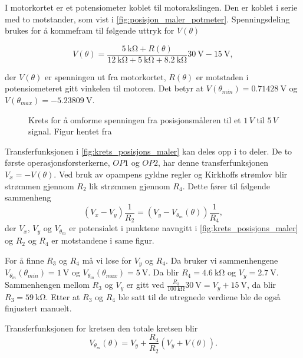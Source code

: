 I motorkortet er et potensiometer koblet til motorakslingen. Den er koblet i serie med to motstander, som vist i \autoref{fig:posisjon_maler_potmeter}. Spenningsdeling brukes for å kommefram til følgende uttryk for $V(\theta)$

\begin{equation}
    \label{eq:V_av_theta}
    V(\theta) = \frac{\SI{5}{\kilo\ohm} + R(\theta)}{\SI{12}{\kilo\ohm} + \SI{5}{\kilo\ohm} + \SI{8.2}{\kilo\ohm}} \SI{30}{\volt} - \SI{15}{\volt},
\end{equation}

der $V(\theta)$ er spenningen ut fra motorkortet, $R(\theta)$ er motstaden i potensiometeret gitt vinkelen til motoren. Det betyr at $V(\theta_{min}) = \SI{0.71428}{\volt}$ og $V(\theta_{max}) =\SI{-5.23809}{\volt}$. 

\begin{figure}[h]
    \centering
    
    \caption{Krets for å omforme spenningen fra posisjonsmåleren til et $1\,V$ til $5\,V$ signal. Figur hentet fra \cite{AnalogMotorlabbOppgaver}}
    \label{fig:krets_posisjons_maler}
\end{figure}

Transferfunksjonen i \autoref{fig:krets_posisjons_maler} kan deles opp i to deler. De to første operasjonsforsterkerne, $OP1$ og $OP2$, har denne transferfunksjonen $V_x = -V(\theta)$. Ved bruk av opampens gyldne regler og Kirkhoffs strømlov blir strømmen gjennom $R_2$ lik strømmen gjennom $R_4$. Dette fører til følgende sammenheng
\begin{equation}
    \label{eq:posisjonmåler_skalering}
    (V_x - V_y) \frac{1}{R_2} = (V_y - V_{\theta_m}(\theta)) \frac{1}{R_4},
\end{equation}
der $V_x$, $V_y$ og $V_{\theta_m}$ er potensialet i punktene navngitt i \autoref{fig:krets_posisjons_maler} og $R_2$ og $R_4$ er motstandene i same figur.

For å finne $R_3$ og $R_4$ må vi løse for $V_y$ og $R_4$. Da bruker vi sammenhengene $V_{\theta_m}(\theta_{min}) = \SI{1}{\volt}$ og $V_{\theta_m}(\theta_{max}) = \SI{5}{\volt}$. Da blir $R_4 = \SI{4.6}{\kilo\ohm}$ og 
$V_y = \SI{2.7}{\volt}$. Sammenhengen mellom $R_3$ og $V_y$ er gitt ved $\frac{R_3}{\SI{100}{\kilo\ohm}} \SI{30}{\volt} = V_y + \SI{15}{\volt}$, da blir $R_3 = \SI{59}{\kilo\ohm}$. Etter at $R_3$ og $R_4$ ble satt til de utregnede verdiene ble de også finjustert manuelt.

Transferfunksjonen for kretsen den totale kretsen blir
\begin{equation}
    \label{eq:posisjon_maling_transferfuksjon}
    V_{\theta_m}(\theta) = V_y + \frac{R_4}{R_2}(V_y + V(\theta)).
\end{equation}

